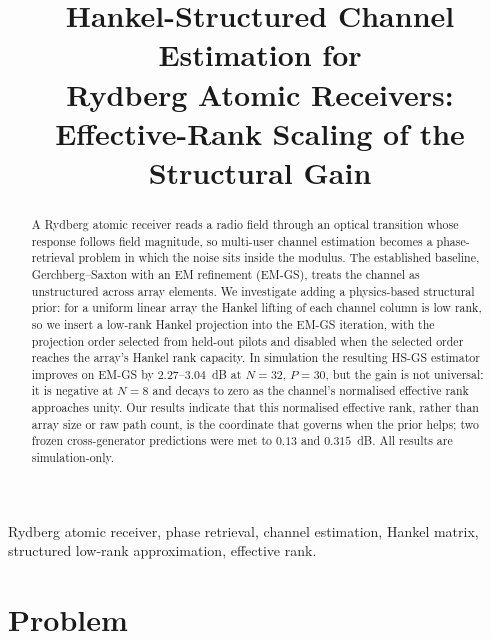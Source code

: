 \documentclass[conference]{IEEEtran}
\begin{document}
\title{Hankel-Structured Channel Estimation for\\
Rydberg Atomic Receivers:\\
\large Effective-Rank Scaling of the Structural Gain}

\author{
}

\maketitle

\begin{abstract}
A Rydberg atomic receiver reads a radio field through an optical transition
whose response follows field magnitude, so multi-user channel estimation
becomes a phase-retrieval problem in which the noise sits inside the modulus.
The established baseline, Gerchberg--Saxton with an EM refinement (EM-GS),
treats the channel as unstructured across array elements. We investigate adding
a physics-based structural prior: for a uniform linear array the Hankel lifting
of each channel column is low rank, so we insert a low-rank Hankel projection
into the EM-GS iteration, with the projection order selected from held-out
pilots and disabled when the selected order reaches the array's Hankel rank
capacity. In simulation the resulting HS-GS estimator improves on EM-GS by
$2.27$--$3.04$~dB at $N=32$, $P=30$, but the gain is not universal: it is
negative at $N=8$ and decays to zero as the channel's normalised effective rank
approaches unity. Our results indicate that this normalised effective rank,
rather than array size or raw path count, is the coordinate that governs when
the prior helps; two frozen cross-generator predictions were met to $0.13$ and
$0.315$~dB. All results are simulation-only.
\end{abstract}

\begin{IEEEkeywords}
Rydberg atomic receiver, phase retrieval, channel estimation, Hankel matrix,
structured low-rank approximation, effective rank.
\end{IEEEkeywords}

\section{Problem}
\end{document}
